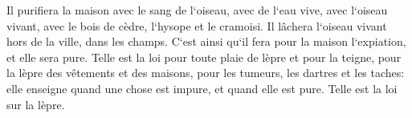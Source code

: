 \verse Il purifiera la maison avec le sang de l`oiseau, avec de l`eau vive, avec l`oiseau vivant, avec le bois de cèdre, l`hysope et le cramoisi. 
\verse Il lâchera l`oiseau vivant hors de la ville, dans les champs. C`est ainsi qu`il fera pour la maison l`expiation, et elle sera pure. 
\verse Telle est la loi pour toute plaie de lèpre et pour la teigne, 
\verse pour la lèpre des vêtements et des maisons, 
\verse pour les tumeurs, les dartres et les taches: 
\verse elle enseigne quand une chose est impure, et quand elle est pure. Telle est la loi sur la lèpre. 

\chapter{}

